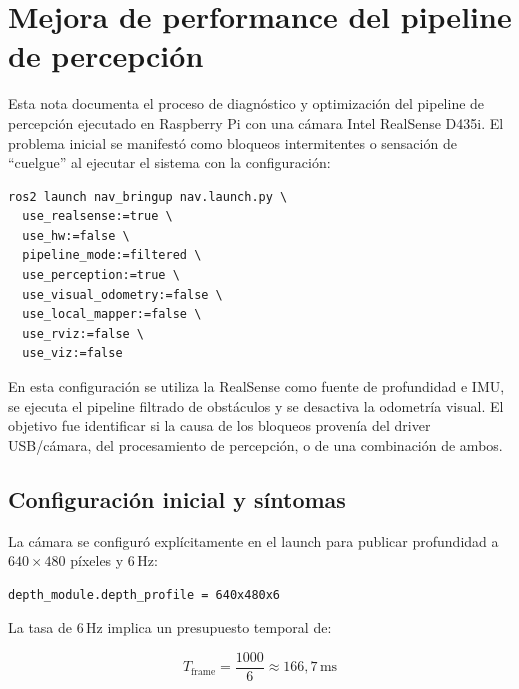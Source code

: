 %
%
%

\section{Mejora de performance del pipeline de percepción}
\label{sec:mejora-performance}

Esta nota documenta el proceso de diagnóstico y optimización del pipeline de
percepción ejecutado en Raspberry Pi con una cámara Intel RealSense D435i. El
problema inicial se manifestó como bloqueos intermitentes o sensación de
``cuelgue'' al ejecutar el sistema con la configuración:

\begin{verbatim}
ros2 launch nav_bringup nav.launch.py \
  use_realsense:=true \
  use_hw:=false \
  pipeline_mode:=filtered \
  use_perception:=true \
  use_visual_odometry:=false \
  use_local_mapper:=false \
  use_rviz:=false \
  use_viz:=false
\end{verbatim}

En esta configuración se utiliza la RealSense como fuente de profundidad e
IMU, se ejecuta el pipeline filtrado de obstáculos y se desactiva la odometría
visual. El objetivo fue identificar si la causa de los bloqueos provenía del
driver USB/cámara, del procesamiento de percepción, o de una combinación de
ambos.

\subsection{Configuración inicial y síntomas}
\label{subsec:perf-sintomas}

La cámara se configuró explícitamente en el launch para publicar profundidad a
$640 \times 480$ píxeles y $6\,\mathrm{Hz}$:

\begin{verbatim}
depth_module.depth_profile = 640x480x6
\end{verbatim}

La tasa de $6\,\mathrm{Hz}$ implica un presupuesto temporal de:

\begin{equation}
  T_{\mathrm{frame}} = \frac{1000}{6} \approx 166{,}7\,\mathrm{ms}
\end{equation}

